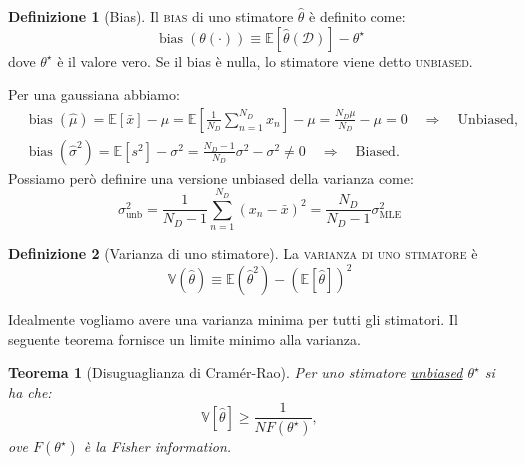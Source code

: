 \documentclass[10pt]{article}
\DeclareMathOperator{\bias}{bias}
\newcommand{\im}[1]{\textsc{#1}}
\newcommand{\MLE}{\ensuremath{\text{MLE}}}
\newtheorem{theorem}{Teorema}[section]
\theoremstyle{definition}
\newtheorem{definition}{Definizione}[section]
\begin{document}
    \begin{definition}[Bias]
        Il \im{bias} di uno stimatore \( \hat{\theta} \) è definito come:
        \begin{equation}
            \bias \left( \theta(\cdot) \right) \equiv \mathbb{E} \left[ \hat{\theta} \left( \mathcal{D} \right) \right] - \theta^\star
        \end{equation}
        dove \( \theta^\star \) è il valore vero. Se il bias è nulla, lo stimatore viene detto
        \im{unbiased}.
    \end{definition}

    Per una gaussiana abbiamo:
    \begin{align}
        & \bias \left( \hat{\mu} \right) = \mathbb{E} \left[\bar{x}\right] - \mu = \mathbb{E} \left[ \frac{1}{N_D}\sum_{n=1}^{N_D} x_n \right] - \mu = \frac{N_D \mu}{N_D} - \mu = 0  \quad \Longrightarrow \quad \text{Unbiased},  \\
        & \bias \left( \hat{\sigma}^2 \right) = \mathbb{E} \left[ s^2 \right] - \sigma^2 = \frac{N_D - 1}{N_D}\sigma^2 - \sigma^2 \neq 0  \quad \Longrightarrow \quad \text{Biased}.
    \end{align}
    Possiamo però definire una versione unbiased della varianza come:
    \begin{equation}
        \sigma^2_{\text{unb}} = \frac{1}{N_D - 1}\sum_{n=1}^{N_D} {\left( x_n - \bar{x} \right)}^2 = \frac{N_D}{N_D - 1}\sigma^2_{\MLE}
    \end{equation}

    \begin{definition}[Varianza di uno stimatore]
        La \im{varianza di uno stimatore} è
        \begin{equation}
            \mathbb{V} ( \hat{\theta} ) \equiv \mathbb{E} ( \hat{\theta}^2 ) - {( \mathbb{E} [ \hat{\theta} ] )}^2
        \end{equation}
    \end{definition}

    Idealmente vogliamo avere una varianza minima per tutti gli stimatori. Il seguente
    teorema fornisce un limite minimo alla varianza.

    \begin{theorem}[Disuguaglianza di Cramér-Rao]
        Per uno stimatore \underline{unbiased} \( \theta^\star \) si ha che:
        \begin{equation}
            \mathbb{V} \left[ \hat{\theta} \right] \geq \frac{1}{NF(\theta^\star)},
        \end{equation}
        ove \( F(\theta^\star) \) è la \textit{Fisher information}.
    \end{theorem}
\end{document}
